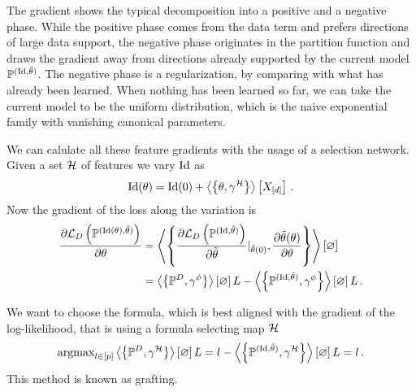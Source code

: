 The gradient shows the typical decomposition into a positive and a negative phase.
While the positive phase comes from the data term and prefers directions of large data support, the negative phase originates in the partition function and draws the gradient away from directions already supported by the current model $\mathbb{P}^{(\mathrm{Id}, \tilde{\theta})}$.
The negative phase is a regularization, by comparing with what has already been learned.
When nothing has been learned so far, we can take the current model to be the uniform distribution, which is the naive exponential family with vanishing canonical parameters. 



We can calulate all these feature gradients with the usage of a selection network.
Given a set $\mathcal{H}$ of features we vary $\mathrm{Id}$ as
\begin{align*}
	 \naivestat(\canparam) %
	= \naivestat(0) + \sbcontractionof{\canparam,\sencodingof{\fselectionmap}}{\shortcatvariables} \, . 
\end{align*}
Now the gradient of the loss along the variation is
\begin{align*}
	 \frac{\partial \mathcal{L}_{D}\left(\mathbb{P}^{(\mathrm{Id}(\theta), \tilde{\theta})}\right)}{\partial\theta} 
	 &= \left\langle \left\{
	 	\frac{\partial\mathcal{L}_{D}\left(\mathbb{P}^{(\mathrm{Id}, \tilde{\theta})}\right)}{\partial\tilde{\theta}}|_{\tilde{\theta}(0)},
		\frac{\partial\tilde{\theta}(\theta)}{\partial\theta} 
	 \right\}\right\rangle \left[ \varnothing \right]  \\
	 &= \left\langle \left\{\mathbb{P}^{D},\gamma^{\phi}\right\}\right\rangle \left[ \varnothing \right]{L} -   \left\langle \left\{\mathbb{P}^{(\mathrm{Id}, \tilde{\theta})},\gamma^{\phi}\right\}\right\rangle \left[ \varnothing \right]{L} \, . 
\end{align*}



We want to choose the formula, which is best aligned with the gradient of the log-likelihood, that is using a formula selecting map $\mathcal{H}$
\begin{align*}
	\mathrm{argmax}_{l\in[p]} \left\langle \left\{\mathbb{P}^{D},\gamma^{\mathcal{H}}\right\}\right\rangle \left[ \varnothing \right]{L=l} - \left\langle \left\{\mathbb{P}^{(\mathrm{Id}, \tilde{\theta})},\gamma^{\mathcal{H}}\right\}\right\rangle \left[ \varnothing \right]{L=l} \, . 
\end{align*}
This method is known as grafting.


